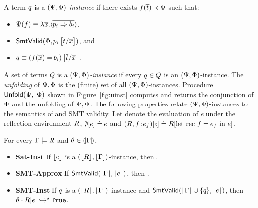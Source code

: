 %
A term $q$ is a \emph{$(\Psi,\Phi)$-instance} if
there exists $f({\overline{t}}) \prec \Phi$
such that:
%
\begin{itemize}
\item $\Psi(f) \equiv \lambda \overline{x}. \langle \overline{p_i \Rightarrow b_i} \rangle$,
\item $\mathsf{SmtValid}(\Phi, {p_i}\left[\overline{t}/\overline{x}\right])$, and
\item $\predb \equiv \SUBSTS{(\fapp{\rfun}{x} = \body_i)}{x}{\expr}$.
\end{itemize}
%
A set of terms $Q$ is a \emph{$(\Psi, \Phi)$-instance}
if every $q \in Q$ is an $(\Psi, \Phi)$-instance.
%
The \emph{unfolding} of $\Psi, \Phi$ is the
(finite) set of all $(\Psi, \Phi)$-instances.
%
Procedure $\mathsf{Unfold}(\Psi,\ \Phi)$ shown in
Figure~\ref{fig:uinst} computes and returns
the conjunction of $\Phi$ and the unfolding
of $\Psi, \Phi$.
%
The following properties relate $(\Psi, \Phi)$-instances
to the semantics of \corelan and SMT validity.
Let  denote the evaluation
of $e$ under the reflection environment $R$, \ie
$\emptyset [e] \doteq e$
and
$(R, {{f}\!:\!{e_f}}) [e] \doteq R [\text{let rec } f = e_f \text{ in } e]$.

\begin{lemma}\label{lem:pbe:semantics}
For every $\Gamma \models R$ and $\theta\in (\!|\Gamma|\!)$,
\begin{itemize}
\item\textbf{Sat-Inst}  \label{lem:sat-inst}
If $\lfloor e\rfloor $ is a $(\lfloor R\rfloor ,\lfloor \Gamma\rfloor )$-instance,
then .
\item\textbf{SMT-Approx}\label{lem:smt-approx}
If $\mathsf{SmtValid}(\lfloor \Gamma\rfloor , \lfloor e\rfloor )$,
then .
\item\textbf{SMT-Inst} \label{lem:smt-inst}
If $q$ is a $(\lfloor R\rfloor ,\lfloor \Gamma\rfloor )$-instance
and $\mathsf{SmtValid}(\lfloor \Gamma\rfloor  \cup \{ q \}, \lfloor e\rfloor )$,
then ${\theta \cdot R [e]}\hookrightarrow^{\star}{\texttt{True}}$.
\end{itemize}
\end{lemma}


